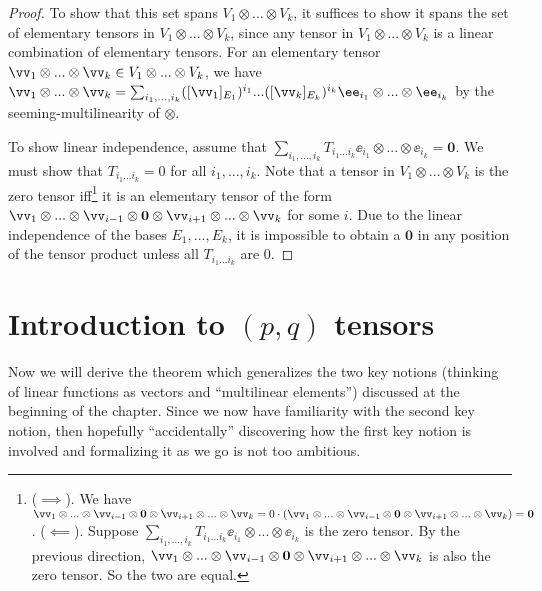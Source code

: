 \begin{proof}      
      To show that this set spans $V_1 \otimes ... \otimes V_k$, it suffices to show it spans the set of elementary tensors in $V_1 \otimes ... \otimes V_k$, since any tensor in $V_1 \otimes ... \otimes V_k$ is a linear combination of elementary tensors. For an elementary tensor $\vv_1 \otimes ... \otimes \vv_k \in V_1 \otimes ... \otimes V_k$, we have $\vv_1 \otimes ... \otimes \vv_k = \sum_{i_1, ..., i_k} ([\vv_1]_{E_1})^{i_1} ... ([\vv_k]_{E_k})^{i_k} \ee_{i_1} \otimes ... \otimes \ee_{i_k}$ by the seeming-multilinearity of $\otimes$.
      
      To show linear independence, assume that $\sum_{i_1, ..., i_k} T_{i_1 ... i_k} \ee_{i_1} \otimes ... \otimes \ee_{i_k} = \mathbf{0}$. We must show that $T_{i_1 ... i_k} = 0$ for all $i_1, ..., i_k$. Note that a tensor in $V_1 \otimes ... \otimes V_k$ is the zero tensor iff\footnote{($\implies$). We have $\vv_1 \otimes ... \otimes \vv_{i - 1} \otimes \mathbf{0} \otimes \vv_{i + 1} \otimes ... \otimes \vv_k = 0 \cdot (\vv_1 \otimes ... \otimes \vv_{i - 1} \otimes \mathbf{0} \otimes \vv_{i + 1} \otimes ... \otimes \vv_k) = \mathbf{0}$. ($\impliedby$). Suppose $\sum_{i_1, ..., i_k} T_{i_1 ... i_k} \ee_{i_1} \otimes ... \otimes \ee_{i_k}$ is the zero tensor. By the previous direction, $\vv_1 \otimes ... \otimes \vv_{i - 1} \otimes \mathbf{0} \otimes \vv_{i + 1} \otimes ... \otimes \vv_k$ is also the zero tensor. So the two are equal.} it is an elementary tensor of the form $\vv_1 \otimes ... \otimes \vv_{i - 1} \otimes \mathbf{0} \otimes \vv_{i + 1} \otimes ... \otimes \vv_k$ for some $i$. Due to the linear independence of the bases $E_1, ..., E_k$, it is impossible to obtain a $\mathbf{0}$ in any position of the tensor product unless all $T_{i_1 ... i_k}$ are $0$.
\end{proof}

\newpage

\section{Introduction to $(p, q)$ tensors}
\label{ch::motivated_intro::sec::motivated_intro}

Now we will derive the theorem which generalizes the two key notions (thinking of linear functions as vectors and ``multilinear elements'') discussed at the beginning of the chapter. Since we now have familiarity with the second key notion, then hopefully ``accidentally'' discovering how the first key notion is involved and formalizing it as we go is not too ambitious.

